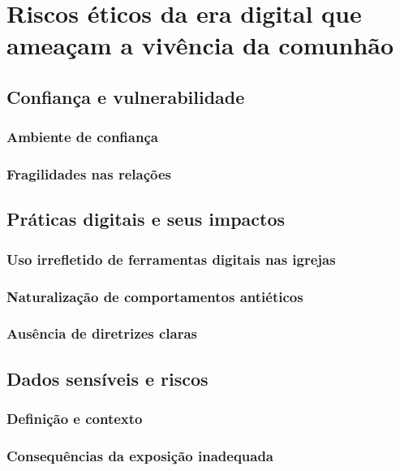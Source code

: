\newpage
\chapter{Riscos éticos da era digital que ameaçam a vivência da comunhão}

\section{Confiança e vulnerabilidade}

\subsection{Ambiente de confiança}

\subsection{Fragilidades nas relações}

\section{Práticas digitais e seus impactos}

\subsection{Uso irrefletido de ferramentas digitais nas igrejas}

\subsection{Naturalização de comportamentos antiéticos}

\subsection{Ausência de diretrizes claras}

\section{Dados sensíveis e riscos}

\subsection{Definição e contexto}

\subsection{Consequências da exposição inadequada}


